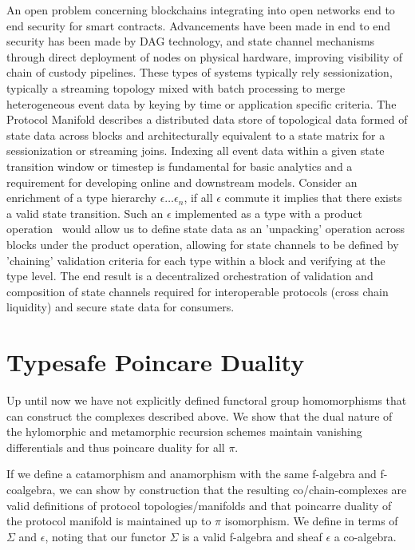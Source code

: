 \documentclass[runningheads]{llncs}
\begin{document}
An open problem concerning blockchains integrating into open networks end to end security for smart contracts. Advancements have been made in end to end security has been made by DAG technology, and state channel mechanisms through direct deployment of nodes on physical hardware, improving visibility of chain of custody pipelines. These types of systems typically rely sessionization, typically a streaming topology mixed with batch processing to merge heterogeneous event data by keying by time or application specific criteria. The Protocol Manifold describes a distributed data store of topological data formed of state data across blocks and architecturally equivalent to a state matrix for a sessionization or streaming joins. Indexing all event data within a given state transition window or timestep is fundamental for basic analytics and a requirement for developing online and downstream models. Consider an enrichment of a type hierarchy $\epsilon \dots \epsilon_{n}$, if all $\epsilon$ commute it implies that there exists a valid state transition. Such an $\epsilon$ implemented as a type with a product operation~\cite{ref_url2} would allow us to define state data as an ’unpacking’ operation across blocks under the product operation, allowing for state channels to be defined by 'chaining' validation criteria for each type within a block and verifying at the type level. The end result is a decentralized orchestration of validation and composition of state channels required for interoperable protocols (cross chain liquidity) and secure state data for consumers.

\section{Typesafe Poincare Duality}
Up until now we have not explicitly defined functoral group homomorphisms that can construct the complexes described above. We show that the dual nature of the hylomorphic and metamorphic recursion schemes maintain vanishing differentials and thus poincare duality for all $\pi$.

If we define a catamorphism and anamorphism with the same f-algebra and f-coalgebra, we can show by construction that the resulting co/chain-complexes are valid definitions of protocol topologies/manifolds and that poincarre duality of the protocol manifold is maintained up to $\pi$ isomorphism. We define in terms of $\Sigma$ and $\epsilon$, noting that our functor $\Sigma$ is a valid f-algebra and sheaf $\epsilon$ a co-algebra.
\end{document}
